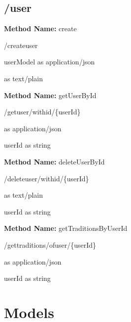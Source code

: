 \section{/user}
\textbf{Method Name: }create
\begin{post}
/createuser
\end{post}
\begin{request}
userModel as application/json
\end{request}
\begin{response}
 as text/plain
\end{response}
\textbf{Method Name: }getUserById
\begin{get}
/getuser/withid/\{userId\}
\end{get}
\begin{response}
 as application/json
\end{response}
\begin{parameter}
userId as string
\end{parameter}
\textbf{Method Name: }deleteUserById
\begin{delete}
/deleteuser/withid/\{userId\}
\end{delete}
\begin{response}
 as text/plain
\end{response}
\begin{parameter}
userId as string
\end{parameter}
\textbf{Method Name: }getTraditionsByUserId
\begin{get}
/gettraditions/ofuser/\{userId\}
\end{get}
\begin{response}
 as application/json
\end{response}
\begin{parameter}
userId as string
\end{parameter}
\chapter{Models}
